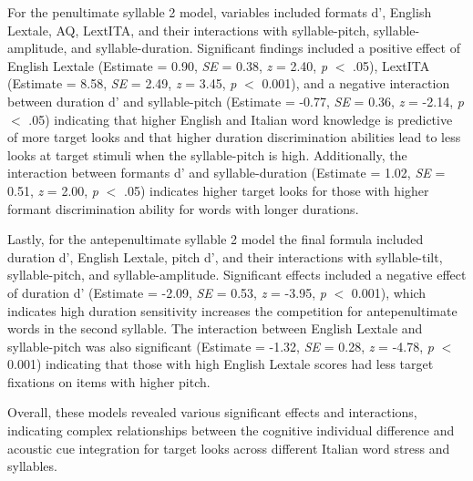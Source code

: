 For the penultimate syllable 2 model, variables included formats d', English Lextale, AQ, LextITA, and their interactions with syllable-pitch, syllable-amplitude, and syllable-duration. Significant findings included a positive effect of English Lextale (Estimate = 0.90, \textit{SE} = 0.38, \textit{z} = 2.40, \textit{p} $<$ .05), LextITA (Estimate = 8.58, \textit{SE} = 2.49, \textit{z} = 3.45, \textit{p} $<$ 0.001), and a negative interaction between duration d' and syllable-pitch (Estimate = -0.77, \textit{SE} = 0.36, \textit{z} = -2.14, \textit{p} $<$ .05) indicating that higher English and Italian word knowledge is predictive of more target looks and that higher duration discrimination abilities lead to less looks at target stimuli when the syllable-pitch is high. Additionally, the interaction between formants d' and syllable-duration (Estimate = 1.02, \textit{SE} = 0.51, \textit{z} = 2.00, \textit{p} $<$ .05) indicates higher target looks for those with higher formant discrimination ability for words with longer durations.

Lastly, for the antepenultimate syllable 2 model the final formula included duration d', English Lextale, pitch d', and their interactions with syllable-tilt, syllable-pitch, and syllable-amplitude. Significant effects included a negative effect of duration d' (Estimate = -2.09, \textit{SE} = 0.53, \textit{z} = -3.95, \textit{p} $<$ 0.001), which indicates high duration sensitivity increases the competition for antepenultimate words in the second syllable. The interaction between English Lextale and syllable-pitch was also significant (Estimate = -1.32, \textit{SE} = 0.28, \textit{z} = -4.78, \textit{p} $<$ 0.001) indicating that those with high English Lextale scores had less target fixations on items with higher pitch.

Overall, these models revealed various significant effects and interactions, indicating complex relationships between the cognitive individual difference and acoustic cue integration for target looks across different Italian word stress and syllables.

